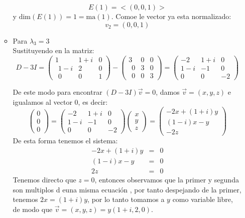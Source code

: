 \begin{itemize}
\begin{itemize}
        
        \[E(1)=<(0,0,1)>\]
        y $\text{dim}(E(1))=1=\text{ma}(1)$. 
        Comoe le vector ya esta normalizado:
        \[v_2=(0,0,1)\]
        
    
    
    
    
    \item Para $\lambda_3=3$\\
        Sustituyendo en la matriz:
        \[D-3I=\begin{pmatrix}1&1+i&0\\ \:\:1-i&2&0\\ \:\:0&0&1\end{pmatrix}-\begin{pmatrix}3&0&0\\ \:\:0&3&0\\ \:\:0&0&3\end{pmatrix}=\begin{pmatrix}-2&1+i&0\\ 1-i&-1&0\\ 0&0&-2\end{pmatrix}\]
        
        
        De este modo para encontrar $(D-3I)\Vec{v}=0$, damos $\vec{v}=(x,y,z)$ e igualamos al vector 0, es decir:
        \[\begin{pmatrix}0\\0\\0\end{pmatrix}=\begin{pmatrix}-2&1+i&0\\ 1-i&-1&0\\ 0&0&-2\end{pmatrix}\begin{pmatrix}x\\y\\z\end{pmatrix}=\begin{pmatrix}-2x+(1+i)y\\(1-i)x-y\\ -2z\end{pmatrix}\]
        De esta forma tenemos el sistema:
        \begin{eqnarray*}
        -2x+(1+i)y&=&0\\
        (1-i)x-y&=&0        \\
        2z&=&0
        \end{eqnarray*}
        Tenemos directo que $z=0$, entonces observamos que la primer y segunda son multiplos d euna misma ecuaci\'on , por tanto despejando de la primer, tenemos $2x=(1+i)y$, por lo tanto tomamos a $y$ como variable libre, de modo que $\vec{v}=(x,y,z)=y(1+i,2,0)$.
        

\end{itemize}
\end{itemize}
